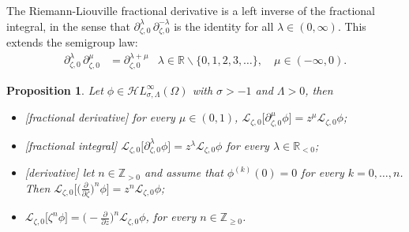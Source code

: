 \documentclass{article}
\newcommand{\singexp}[2]{\mathcal{H}L^\infty_{#1, #2}}
\newcommand{\Z}{\mathbb{Z}}
\newcommand{\R}{\mathbb{R}}
\newcommand{\fracderiv}[3]{\partial^{#1}_{#2, #3}}
\newcommand{\laplace}{\mathcal{L}}
\theoremstyle{definition}
\theoremstyle{plain}
\newtheorem{prop}[definition]{Proposition}
\begin{document}
The Riemann-Liouville fractional derivative is a left inverse of the fractional integral, in the sense that $\fracderiv{\lambda}{\zeta}{ 0}\,\fracderiv{-\lambda}{\zeta}{0}$ is the identity for all $\lambda \in (0, \infty)$. This extends the semigroup law:
\begin{align*}
\fracderiv{\lambda}{\zeta}{0}\,\fracderiv{\mu}{\zeta}{0} & = \fracderiv{\lambda+\mu}{\zeta}{0} & \lambda \in \R \smallsetminus \{0, 1, 2, 3, \ldots\},\quad\mu \in (-\infty, 0).
\end{align*}
\begin{prop}\label{prop:L-int-op}
Let $\phi\in\singexp{\sigma}{\Lambda}(\Omega)$ with $\sigma>-1$ and $\Lambda>0$, then
\begin{itemize}
\item[(i)] \emph{[fractional derivative]} for every $\mu\in(0,1)$, $\laplace_{\zeta,0} \big[\fracderiv{\mu}{\zeta}{0} \phi\big] = z^{\mu} \laplace_{\zeta,0} \phi$;
\item[(ii)] \emph{[fractional integral]} $\laplace_{\zeta,0} \big[\fracderiv{\lambda}{\zeta}{0} \phi\big] = z^{\lambda} \laplace_{\zeta,0} \phi$ for every $\lambda\in\R_{<0}$;
\item[(iii)] \emph{[derivative]} let $n\in\Z_{>0}$ and assume that $ \phi^{(k)}(0)=0$ for every $k=0,\ldots,n$. Then $\laplace_{\zeta,0} \big[\big(\frac{\partial}{\partial\zeta}\big)^n \phi\big] = z^{n} \laplace_{\zeta,0} \phi$;
\item[(iv)] $\laplace_{\zeta,0} \big[\zeta^n \phi\big] = \big(-\frac{\partial}{\partial z}\big)^n \laplace_{\zeta,0} \phi$, 
for every $n\in\Z_{\geq 0}$.
\end{itemize}
\end{prop}
\end{document}
